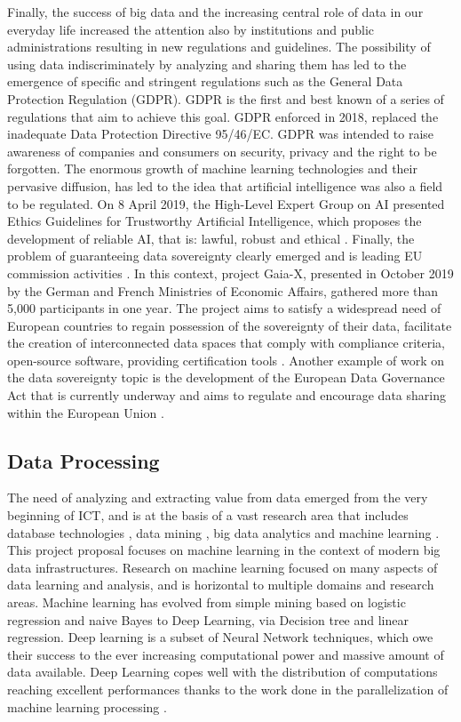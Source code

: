 Finally, the success of big data and the increasing central role of data in our everyday life increased the attention also by institutions and public administrations resulting in new regulations and guidelines.
%
The possibility of using data indiscriminately by analyzing and sharing them has led to the emergence of specific and stringent regulations such as the General Data Protection Regulation (GDPR)\cite{gdpr}. GDPR is the first and best known of a series of regulations that aim to achieve this goal. GDPR enforced in 2018, replaced the inadequate Data Protection Directive 95/46/EC. GDPR was intended to raise awareness of companies and consumers on security, privacy and the right to be forgotten.
%
The enormous growth of machine learning technologies and their pervasive diffusion, has led to the idea that artificial intelligence was also a field to be regulated. On 8 April 2019, the High-Level Expert Group on AI presented Ethics Guidelines for Trustworthy Artificial Intelligence, which proposes the development of reliable AI, that is: lawful, robust and ethical \cite{euai}.
%
Finally, the problem of guaranteeing data sovereignty clearly emerged and is leading EU commission activities \cite{pedreira2021review}. In this context, project Gaia-X, presented in October 2019 by the German and French Ministries of Economic Affairs, gathered more than 5,000 participants in one year. The project aims to satisfy a widespread need of European countries to regain possession of the sovereignty of their data, facilitate the creation of interconnected data spaces that comply with compliance criteria, open-source software, providing certification tools \cite{gaiax}. Another example of work on the data sovereignty topic is the development of the European Data Governance Act that is currently underway and aims to regulate and encourage data sharing within the European Union \cite{edca}.
\subsection{Data Processing}
The need of analyzing and extracting value from data emerged from the very beginning of ICT,
and is at the basis of a vast research area that includes database technologies \cite{palanisamy2020survey},
data mining \cite{jain2013data,castano2017exploratory},
big data analytics \cite{tsai2015big} and machine learning \cite{qiu2016survey}.
This project proposal focuses on machine learning in the context of modern big data infrastructures.
Research on machine learning focused on many aspects of data learning and analysis,
and is horizontal to multiple domains and research areas.
Machine learning has evolved from simple mining based on logistic regression and naive Bayes to Deep Learning,
via Decision tree and linear regression.
Deep learning is a subset of Neural Network techniques,
which owe their success to the ever increasing computational power and massive amount of data available.
Deep Learning copes well with the distribution of computations reaching excellent performances thanks to the work done in the parallelization of machine learning processing \cite{verbraeken2020survey, Goodfellow-et-al-2016,wu2022survey}.

